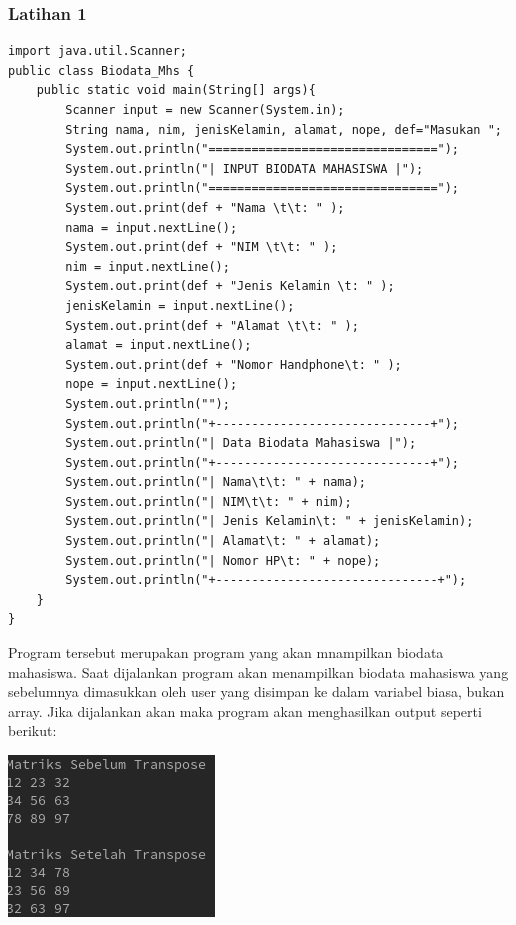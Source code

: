\documentclass[a4paper,12pt]{article}
\begin{document}
\subsubsection{Latihan 1}
\begin{lstlisting}
import java.util.Scanner;
public class Biodata_Mhs {
    public static void main(String[] args){
        Scanner input = new Scanner(System.in);
        String nama, nim, jenisKelamin, alamat, nope, def="Masukan ";
        System.out.println("================================");
        System.out.println("| INPUT BIODATA MAHASISWA |");
        System.out.println("================================");
        System.out.print(def + "Nama \t\t: " );
        nama = input.nextLine();
        System.out.print(def + "NIM \t\t: " );
        nim = input.nextLine();
        System.out.print(def + "Jenis Kelamin \t: " );
        jenisKelamin = input.nextLine();
        System.out.print(def + "Alamat \t\t: " );
        alamat = input.nextLine();
        System.out.print(def + "Nomor Handphone\t: " );
        nope = input.nextLine();
        System.out.println("");
        System.out.println("+------------------------------+");
        System.out.println("| Data Biodata Mahasiswa |");
        System.out.println("+------------------------------+");
        System.out.println("| Nama\t\t: " + nama);
        System.out.println("| NIM\t\t: " + nim);
        System.out.println("| Jenis Kelamin\t: " + jenisKelamin);
        System.out.println("| Alamat\t: " + alamat);
        System.out.println("| Nomor HP\t: " + nope);
        System.out.println("+-------------------------------+");
    }
}
\end{lstlisting}
Program tersebut merupakan program yang akan mnampilkan biodata mahasiswa. Saat dijalankan program akan menampilkan biodata mahasiswa yang sebelumnya dimasukkan 
oleh user yang disimpan ke dalam variabel biasa, bukan array. Jika dijalankan akan maka program akan menghasilkan output seperti berikut:\\
\begin{center}
    \includegraphics[scale=.7]{6.png}
\end{center}
\end{document}
